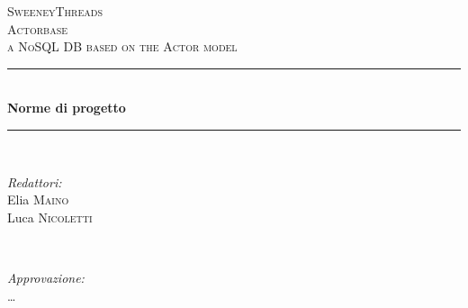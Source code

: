 \documentclass[a4paper]{report}
\begin{document}
\begin{titlepage}
\newcommand{\HRule}{\rule{\linewidth}{0.5mm}} %
\center  
\textsc{\LARGE SweeneyThreads}\\[1.5cm] 
\textsc{\Large Actorbase}\\[0.5cm] 
\textsc{\large a NoSQL DB based on the Actor model}\\[0.5cm]

\HRule \\[0.4cm]
{ \huge \bfseries Norme di progetto}\\[0.4cm] 
\HRule \\[1.5cm]
 
 
\begin{minipage}{0.4\textwidth}
\begin{flushleft} \large
\emph{Redattori:}\\
Elia \textsc{Maino} \\
Luca \textsc{Nicoletti} \\
\end{flushleft}
\end{minipage}
~
\begin{minipage}{0.4\textwidth}
\begin{flushright} \large
\emph{Approvazione:} \\
\dots
\end{flushright}
\end{minipage}


\end{titlepage}
\end{document}

